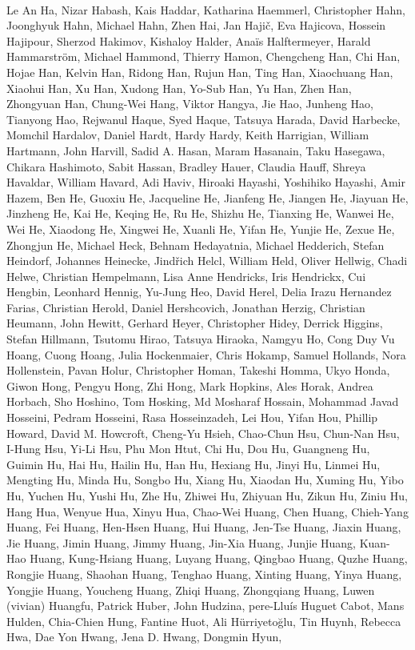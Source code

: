 \paragraph{}Le An Ha, Nizar Habash, Kais Haddar, Katharina Haemmerl, Christopher Hahn, Joonghyuk Hahn, Michael Hahn, Zhen Hai, Jan Hajič, Eva Hajicova, Hossein Hajipour, Sherzod Hakimov, Kishaloy Halder, Anaïs Halftermeyer, Harald Hammarström, Michael Hammond, Thierry Hamon, Chengcheng Han, Chi Han, Hojae Han, Kelvin Han, Ridong Han, Rujun Han, Ting Han, Xiaochuang Han, Xiaohui Han, Xu Han, Xudong Han, Yo-Sub Han, Yu Han, Zhen Han, Zhongyuan Han, Chung-Wei Hang, Viktor Hangya, Jie Hao, Junheng Hao, Tianyong Hao, Rejwanul Haque, Syed Haque, Tatsuya Harada, David Harbecke, Momchil Hardalov, Daniel Hardt, Hardy Hardy, Keith Harrigian, William Hartmann, John Harvill, Sadid A. Hasan, Maram Hasanain, Taku Hasegawa, Chikara Hashimoto, Sabit Hassan, Bradley Hauer, Claudia Hauff, Shreya Havaldar, William Havard, Adi Haviv, Hiroaki Hayashi, Yoshihiko Hayashi, Amir Hazem, Ben He, Guoxiu He, Jacqueline He, Jianfeng He, Jiangen He, Jiayuan He, Jinzheng He, Kai He, Keqing He, Ru He, Shizhu He, Tianxing He, Wanwei He, Wei He, Xiaodong He, Xingwei He, Xuanli He, Yifan He, Yunjie He, Zexue He, Zhongjun He, Michael Heck, Behnam Hedayatnia, Michael Hedderich, Stefan Heindorf, Johannes Heinecke, Jindřich Helcl, William Held, Oliver Hellwig, Chadi Helwe, Christian Hempelmann, Lisa Anne Hendricks, Iris Hendrickx, Cui Hengbin, Leonhard Hennig, Yu-Jung Heo, David Herel, Delia Irazu Hernandez Farias, Christian Herold, Daniel Hershcovich, Jonathan Herzig, Christian Heumann, John Hewitt, Gerhard Heyer, Christopher Hidey, Derrick Higgins, Stefan Hillmann, Tsutomu Hirao, Tatsuya Hiraoka, Namgyu Ho, Cong Duy Vu Hoang, Cuong Hoang, Julia Hockenmaier, Chris Hokamp, Samuel Hollands, Nora Hollenstein, Pavan Holur, Christopher Homan, Takeshi Homma, Ukyo Honda, Giwon Hong, Pengyu Hong, Zhi Hong, Mark Hopkins, Ales Horak, Andrea Horbach, Sho Hoshino, Tom Hosking, Md Mosharaf Hossain, Mohammad Javad Hosseini, Pedram Hosseini, Rasa Hosseinzadeh, Lei Hou, Yifan Hou, Phillip Howard, David M. Howcroft, Cheng-Yu Hsieh, Chao-Chun Hsu, Chun-Nan Hsu, I-Hung Hsu, Yi-Li Hsu, Phu Mon Htut, Chi Hu, Dou Hu, Guangneng Hu, Guimin Hu, Hai Hu, Hailin Hu, Han Hu, Hexiang Hu, Jinyi Hu, Linmei Hu, Mengting Hu, Minda Hu, Songbo Hu, Xiang Hu, Xiaodan Hu, Xuming Hu, Yibo Hu, Yuchen Hu, Yushi Hu, Zhe Hu, Zhiwei Hu, Zhiyuan Hu, Zikun Hu, Ziniu Hu, Hang Hua, Wenyue Hua, Xinyu Hua, Chao-Wei Huang, Chen Huang, Chieh-Yang Huang, Fei Huang, Hen-Hsen Huang, Hui Huang, Jen-Tse Huang, Jiaxin Huang, Jie Huang, Jimin Huang, Jimmy Huang, Jin-Xia Huang, Junjie Huang, Kuan-Hao Huang, Kung-Hsiang Huang, Luyang Huang, Qingbao Huang, Quzhe Huang, Rongjie Huang, Shaohan Huang, Tenghao Huang, Xinting Huang, Yinya Huang, Yongjie Huang, Youcheng Huang, Zhiqi Huang, Zhongqiang Huang, Luwen (vivian) Huangfu, Patrick Huber, John Hudzina, ‪pere-Lluís Huguet Cabot, Mans Hulden, Chia-Chien Hung, Fantine Huot, Ali Hürriyetoğlu, Tin Huynh, Rebecca Hwa, Dae Yon Hwang, Jena D. Hwang, Dongmin Hyun,
